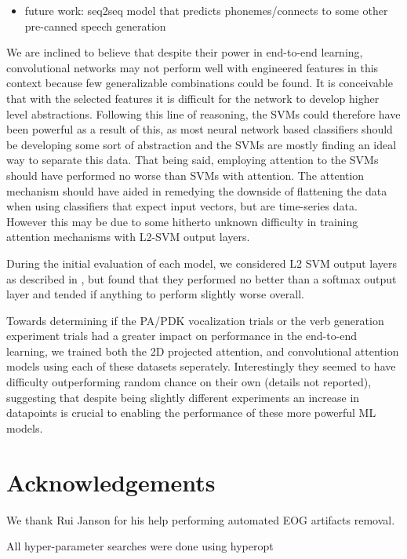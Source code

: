 \documentclass[utf8]{frontiersSCNS} %
\begin{document}
\begin{itemize}
\item future work: seq2seq model that predicts phonemes/connects to some other pre-canned speech generation
\end{itemize}



We are inclined to believe that despite their power in end-to-end learning, convolutional networks may not perform well with engineered features in this context because few generalizable combinations could be found. It is conceivable that with the selected features it is difficult for the network to develop higher level abstractions. Following this line of reasoning, the SVMs could therefore have been powerful as a result of this, as most neural network based classifiers should be developing some sort of abstraction and the SVMs are mostly finding an ideal way to separate this data. That being said, employing attention to the SVMs should have performed no worse than SVMs with attention. The attention mechanism should have aided in remedying the downside of flattening the data when using classifiers that expect input vectors, but are time-series data. However this may be due to some hitherto unknown difficulty in training attention mechanisms with L2-SVM output layers.

During the initial evaluation of each model, we considered L2 SVM output layers as described in \cite{l2svmuoftpaper}, but found that they performed no better than a softmax output layer and tended if anything to perform slightly worse overall.

Towards determining if the PA/PDK vocalization trials or the verb generation experiment trials had a greater impact on performance in the end-to-end learning, we trained both the 2D projected attention, and convolutional attention models using each of these datasets seperately. Interestingly they seemed to have difficulty outperforming random chance on their own (details not reported), suggesting that despite being slightly different experiments an increase in datapoints is crucial to enabling the performance of these more powerful ML models.

\section{Acknowledgements}

We thank Rui Janson for his help performing automated EOG artifacts removal.


All hyper-parameter searches were done using hyperopt \cite{Bergstra2013}


\end{document}
